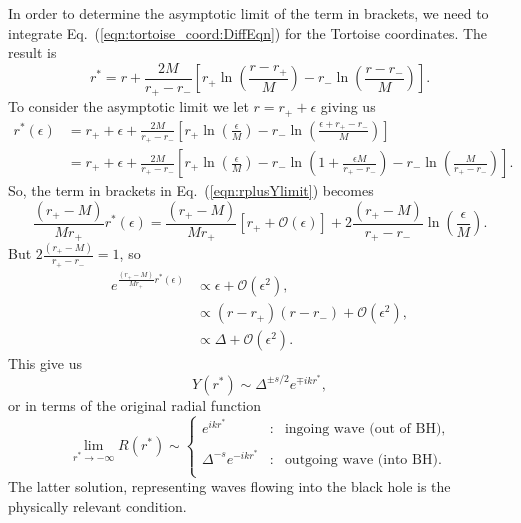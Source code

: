 \documentclass[11pt]{article}
\begin{document}
In order to determine the asymptotic limit of the term in brackets, we
need to integrate Eq.~(\ref{eqn:tortoise_coord:DiffEqn}) for the
Tortoise coordinates.  The result is
\begin{equation}\label{eqn:Tortose_coord}
  r^* = r + \frac{2M}{r_+-r_\minus}\left[
    r_+\ln\left(\frac{r-r_+}{M}\right) 
    - r_\minus\ln\left(\frac{r-r_\minus}{M}\right)\right].
\end{equation}
To consider the asymptotic limit we let $r=r_++\epsilon$ giving us
\begin{align}
   r^*(\epsilon) &= r_+ + \epsilon + \frac{2M}{r_+-r_\minus}\left[
    r_+\ln\left(\frac{\epsilon}{M}\right) 
    - r_\minus\ln\left(\frac{\epsilon +r_+-r_\minus}{M}\right)\right] \nonumber\\ 
   &= r_+ + \epsilon + \frac{2M}{r_+-r_\minus}\left[
    r_+\ln\left(\frac{\epsilon}{M}\right) 
    - r_\minus\ln\left(1+\frac{\epsilon M}{r_+-r_\minus}\right)
   - r_\minus\ln\left(\frac{M}{r_+-r_\minus}\right)\right].
\end{align}
So, the term in brackets in Eq.~(\ref{eqn:rplusYlimit}) becomes
\begin{equation}
  \frac{(r_+-M)}{Mr_+}r^*(\epsilon) =
     \frac{(r_+-M)}{Mr_+}\left[r_+ + \mathcal{O}(\epsilon)\right]
     + 2\frac{(r_+-M)}{r_+-r_\minus}\ln\left(\frac\epsilon{M}\right).
\end{equation}
But $2\frac{(r_+-M)}{r_+-r_\minus}=1$, so
\begin{align}
  e^{\frac{(r_+-M)}{Mr_+}r^*(\epsilon)} &\propto \epsilon + \mathcal{O}(\epsilon^2), \\
       &\propto (r-r_+)(r-r_\minus) + \mathcal{O}(\epsilon^2), \\
       &\propto \Delta + \mathcal{O}(\epsilon^2).
\end{align}
This give us
\begin{equation}
   Y(r^*) \sim \Delta^{\pm{s}/2}e^{\mp{i}k{r^*}},
\end{equation}
or in terms of the original radial function
\begin{equation}
  \lim_{r^*\to-\infty}R(r^*) \sim \left\{\begin{array}{lcl}
      e^{ik{r^*}} &:& \mbox{ingoing wave (out of BH)}, \\ \\
     \Delta^{-s}e^{-ik{r^*}} &:& \mbox{outgoing wave (into BH)}. \\
   \end{array}\right.
\end{equation}
The latter solution, representing waves flowing into the black hole is the physically relevant condition.
\end{document}
